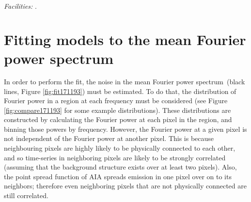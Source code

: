 \documentclass{aastex}
\newcommand{\PS}{power spectrum}
\newcommand{\mFps}{mean Fourier \PS}
\begin{document}


{\it Facilities:} .



\appendix

\section{Fitting models to the \mFps}\label{sec:app:ind}
In order to perform the fit, the noise in the \mFps\ (black lines,
Figure \ref{fig:fit171193}) must be estimated.  To do that, the
distribution of Fourier power in a region at each frequency must be
considered (see Figure \ref{fig:compare171193} for some example
distributions).  These distributions are constructed by calculating
the Fourier power at each pixel in the region, and binning those
powers by frequency.  However, the Fourier power at a given pixel is
not independent of the Fourier power at another pixel.  This is
because neighbouring pixels are highly likely to be physically
connected to each other, and so time-series in neighboring pixels are
likely to be strongly correlated (assuming that the background
structure exists over at least two pixels).  Also, the point spread
function of AIA spreads emission in one pixel over on to its
neighbors; therefore even neighboring pixels that are not physically
connected are still correlated.
\end{document}
